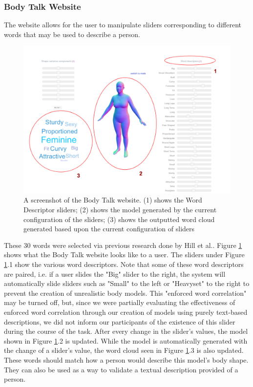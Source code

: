 \documentclass[journal]{vgtc}                %
\begin{document}
\subsubsection{Body Talk Website}
\noindent The website allows for the user to manipulate sliders corresponding to different words that may be used to describe a person. 
\begin{figure} [!htb] 
 \centering
  \includegraphics[width=\linewidth]{websiteUI}
  \caption{A screenshot of the Body Talk website. (1) shows the Word Descriptor sliders; (2) shows the model generated by the current configuration of 
  the sliders; (3) shows the outputted word cloud generated based upon the current configuration of sliders}
  \label{fig:websiteUI}
\end{figure}
These 30 words were selected via previous research done by Hill et al.\cite{Hill:15}. Figure \ref{fig:websiteUI} shows what the Body Talk website 
looks like to a user. 
The sliders under Figure \ref{fig:websiteUI}.1 show the various word descriptors. Note that some of these word descriptors are paired, i.e.
if a user slides the "Big" slider to the right, the system will automatically slide sliders such as "Small" to the left or "Heavyset" to the right
to prevent the creation of unrealistic body models. This "enforced word correlation" may be turned off, but, since we were partially
evaluating the effectiveness of enforced word correlation through our creation of models using purely text-based descriptions, we did not inform our
participants of the existence of this slider during the course of the task. After every change in the slider's values, the model shown in Figure 
\ref{fig:websiteUI}.2 is updated. While the model is automatically generated with the change of a slider's value, the word cloud seen in Figure 
\ref{fig:websiteUI}.3 is also updated. These words should match how a person would describe this model's body shape. They can also be used as a way
to validate a textual description provided of a person.
\end{document}
